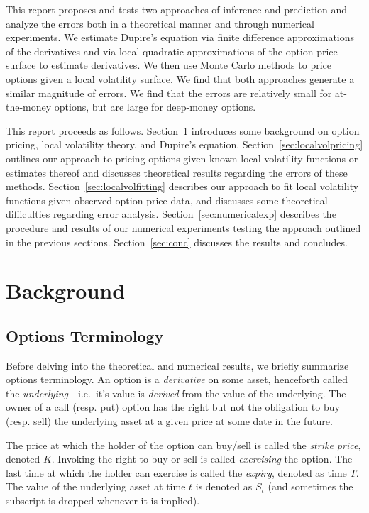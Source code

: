 \documentclass[11pt]{article}
\numberwithin{equation}{section}
\begin{document}
This report proposes and tests two approaches of inference and prediction and analyze the errors both  in  a theoretical manner and through numerical experiments. We estimate Dupire's equation via finite difference approximations of the derivatives and via local quadratic approximations of the option price surface to estimate derivatives. We then use Monte Carlo methods to price options given a local volatility surface. We find that both approaches generate a similar magnitude of errors. We find that the errors are relatively small for at-the-money options, but are large for deep-money options. 

This report proceeds as follows. Section~\ref{sec:background} introduces some background on option pricing, local volatility theory, and Dupire's equation. Section~\ref{sec:localvolpricing} outlines our approach to pricing options given known local volatility functions or estimates thereof and discusses theoretical results regarding the errors of these methods. Section~\ref{sec:localvolfitting} describes our approach to fit local volatility functions given observed option price data, and discusses some theoretical difficulties regarding error analysis. Section~\ref{sec:numericalexp} describes the procedure and results of our numerical experiments testing the approach outlined in the previous sections. Section~\ref{sec:conc} discusses the results and concludes.

\section{Background}
\label{sec:background}

\subsection{Options Terminology}
\label{subsec:terminology}

Before delving into the theoretical and numerical results, we briefly summarize
options terminology. An option is a \emph{derivative} on some asset, henceforth
called the \emph{underlying}---i.e.\ it's value is \emph{derived} from the value
of the underlying. The owner of a call (resp. put) option has the right but not
the obligation to buy (resp. sell) the underlying asset at a given price at some
date in the future.

The price at which the holder of the option can buy/sell is called the
\emph{strike price}, denoted $K$. Invoking the right to buy or sell is called
\emph{exercising} the option. The last time at which the holder can exercise is
called the \emph{expiry}, denoted as time $T$. The value of the underlying asset
at time $t$ is denoted as $S_t$ (and sometimes the subscript is dropped whenever
it is implied). 
\end{document}
